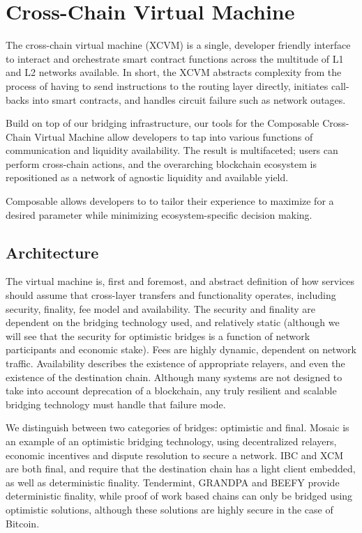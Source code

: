 \section{Cross-Chain Virtual Machine}
The cross-chain virtual machine (XCVM) is a single, developer friendly interface to interact and orchestrate smart contract functions across the multitude of L1 and L2 networks available. In short, the XCVM abstracts complexity from the process of having to send instructions to the routing layer directly, initiates call-backs into smart contracts, and handles circuit failure such as network outages.

Build on top of our bridging infrastructure, our tools for the Composable Cross-Chain Virtual Machine allow developers to tap into various functions of communication and liquidity availability. The result is multifaceted; users can perform cross-chain actions, and the overarching blockchain ecosystem is repositioned as a network of agnostic liquidity and available yield.

Composable allows developers to to tailor their experience to maximize for a desired parameter while minimizing ecosystem-specific decision making.

\subsection{Architecture}
The virtual machine is, first and foremost, and abstract definition of how services should assume that cross-layer transfers and functionality operates, including security, finality, fee model and availability. The security and finality are dependent on the bridging technology used, and relatively static (although we will see that the security for optimistic bridges is a function of network participants and economic stake). Fees are highly dynamic, dependent on network traffic. Availability describes the existence of appropriate relayers, and even the existence of the destination chain. Although many systems are not designed to take into account deprecation of a blockchain, any truly resilient and scalable bridging technology must handle that failure mode.

We distinguish between two categories of bridges: optimistic and final. Mosaic is an example of an optimistic bridging technology, using decentralized relayers, economic incentives and dispute resolution to secure a network. IBC and XCM are both final, and require that the destination chain has a light client embedded, as well as deterministic finality. Tendermint, GRANDPA and BEEFY provide deterministic finality, while proof of work based chains can only be bridged using optimistic solutions, although these solutions are highly secure in the case of Bitcoin.

